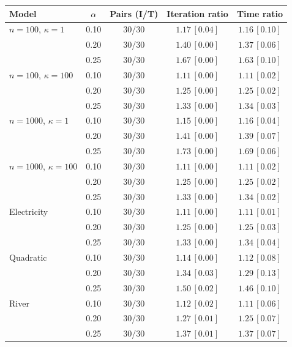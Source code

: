\begin{tabular}{lcccc}
\toprule
Model & $\alpha$ & Pairs (I/T) & Iteration ratio & Time ratio \\
\midrule
$n=100$, $\kappa=1$ & 0.10 & 30/30 & $1.17\, [0.04]$ & $1.16\, [0.10]$ \\
 & 0.20 & 30/30 & $1.40\, [0.00]$ & $1.37\, [0.06]$ \\
 & 0.25 & 30/30 & $1.67\, [0.00]$ & $1.63\, [0.10]$ \\
\midrule
$n=100$, $\kappa=100$ & 0.10 & 30/30 & $1.11\, [0.00]$ & $1.11\, [0.02]$ \\
 & 0.20 & 30/30 & $1.25\, [0.00]$ & $1.25\, [0.02]$ \\
 & 0.25 & 30/30 & $1.33\, [0.00]$ & $1.34\, [0.03]$ \\
\midrule
$n=1000$, $\kappa=1$ & 0.10 & 30/30 & $1.15\, [0.00]$ & $1.16\, [0.04]$ \\
 & 0.20 & 30/30 & $1.41\, [0.00]$ & $1.39\, [0.07]$ \\
 & 0.25 & 30/30 & $1.73\, [0.00]$ & $1.69\, [0.06]$ \\
\midrule
$n=1000$, $\kappa=100$ & 0.10 & 30/30 & $1.11\, [0.00]$ & $1.11\, [0.02]$ \\
 & 0.20 & 30/30 & $1.25\, [0.00]$ & $1.25\, [0.02]$ \\
 & 0.25 & 30/30 & $1.33\, [0.00]$ & $1.34\, [0.02]$ \\
\midrule
Electricity & 0.10 & 30/30 & $1.11\, [0.00]$ & $1.11\, [0.01]$ \\
 & 0.20 & 30/30 & $1.25\, [0.00]$ & $1.25\, [0.03]$ \\
 & 0.25 & 30/30 & $1.33\, [0.00]$ & $1.34\, [0.04]$ \\
\midrule
Quadratic & 0.10 & 30/30 & $1.14\, [0.00]$ & $1.12\, [0.08]$ \\
 & 0.20 & 30/30 & $1.34\, [0.03]$ & $1.29\, [0.13]$ \\
 & 0.25 & 30/30 & $1.50\, [0.02]$ & $1.46\, [0.10]$ \\
\midrule
River & 0.10 & 30/30 & $1.12\, [0.02]$ & $1.11\, [0.06]$ \\
 & 0.20 & 30/30 & $1.27\, [0.01]$ & $1.25\, [0.07]$ \\
 & 0.25 & 30/30 & $1.37\, [0.01]$ & $1.37\, [0.07]$ \\
\bottomrule
\end{tabular}
